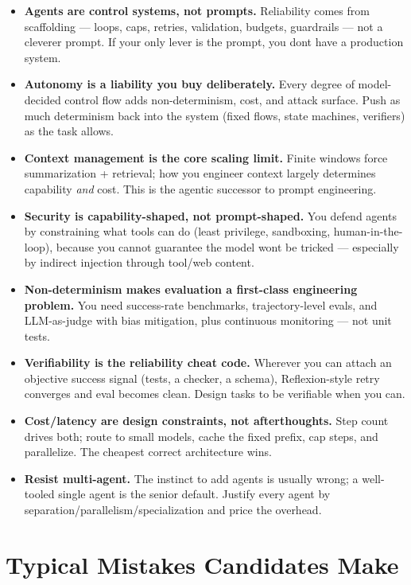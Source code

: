 \documentclass[11pt]{article}
\providecommand{\tightlist}{\setlength{\itemsep}{1pt}\setlength{\parskip}{0pt}}
\begin{document}
\begin{itemize}
\tightlist
\item
  \textbf{Agents are control systems, not prompts.} Reliability comes from scaffolding --- loops, caps, retries, validation, budgets, guardrails --- not a cleverer prompt. If your only lever is the prompt, you don\textquotesingle t have a production system.
\item
  \textbf{Autonomy is a liability you buy deliberately.} Every degree of model-decided control flow adds non-determinism, cost, and attack surface. Push as much determinism back into the system (fixed flows, state machines, verifiers) as the task allows.
\item
  \textbf{Context management is the core scaling limit.} Finite windows force summarization + retrieval; how you engineer context largely determines capability \emph{and} cost. This is the agentic successor to prompt engineering.
\item
  \textbf{Security is capability-shaped, not prompt-shaped.} You defend agents by constraining what tools can do (least privilege, sandboxing, human-in-the-loop), because you cannot guarantee the model won\textquotesingle t be tricked --- especially by indirect injection through tool/web content.
\item
  \textbf{Non-determinism makes evaluation a first-class engineering problem.} You need success-rate benchmarks, trajectory-level evals, and LLM-as-judge with bias mitigation, plus continuous monitoring --- not unit tests.
\item
  \textbf{Verifiability is the reliability cheat code.} Wherever you can attach an objective success signal (tests, a checker, a schema), Reflexion-style retry converges and eval becomes clean. Design tasks to be verifiable when you can.
\item
  \textbf{Cost/latency are design constraints, not afterthoughts.} Step count drives both; route to small models, cache the fixed prefix, cap steps, and parallelize. The cheapest correct architecture wins.
\item
  \textbf{Resist multi-agent.} The instinct to add agents is usually wrong; a well-tooled single agent is the senior default. Justify every agent by separation/parallelism/specialization and price the overhead.
\end{itemize}

\section{Typical Mistakes Candidates Make}\label{typical-mistakes-candidates-make}
\end{document}
